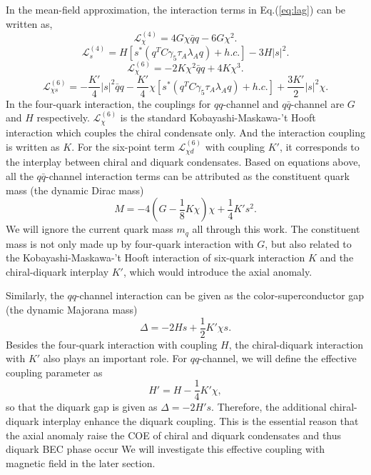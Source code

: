 \documentclass[prd, showpacs,nofootinbib,amsmath,amssymb,12pt]{revtex4}
\begin{document}
In the mean-field approximation, the interaction terms in Eq.(\ref{eq:lag}) can be written as\cite{abuki2010nambu},  
\begin{equation}
\mathcal{L}^{(4)}_{\chi}=4G\chi\bar{q}q-6G\chi^2.
\end{equation}	
\begin{equation}
\mathcal{L}^{(4)}_{s}=H[s^*(q^TC\gamma_5\tau_A\lambda_Aq)+h.c.]-3H|s|^2.
\end{equation}
\begin{equation}
\mathcal{L}^{\left(6\right)}_{\chi}=-2K\chi^2\bar{q}q+4K\chi^3.
\end{equation}
\begin{equation}
\mathcal{L}^{\left(6\right)}_{\chi s}=-\frac{K'}{4}|s|^2\bar{q}q-\frac{K'}{4}\chi[s^*(q^TC\gamma_5\tau_A\lambda_Aq)+h.c.]+\frac{3K'}{2}|s|^2\chi.
\end{equation}
In the four-quark interaction, the couplings for $qq$-channel and $q\bar{q}$-channel are $G$ and $H$ respectively.
$\mathcal{L}^{\left(6\right)}_{\chi}$ is the standard Kobayashi-Maskawa-'t Hooft interaction which couples the chiral condensate only.
And the interaction coupling is written as $K$.
For the six-point term $\mathcal{L}^{\left(6\right)}_{\chi d}$ with coupling $K'$, it corresponds to the interplay between chiral and diquark condensates.
Based on equations above, 
all the $q\bar{q}$-channel interaction terms can be attributed as  the constituent quark mass (the dynamic Dirac mass)
\begin{equation}
M = -4(G-\frac{1}{8}K\chi)\chi + \frac{1}{4}K's^2.
\label{Dmass}
\end{equation}
We will ignore the current quark mass $m_q$ all through this work.
The constituent mass is not only made up by four-quark interaction with $G$,
but also related to the Kobayashi-Maskawa-'t Hooft interaction of six-quark interaction $K$ and the chiral-diquark interplay $K'$, 
which would introduce the axial anomaly.

Similarly, the $qq$-channel  interaction can be given as the color-superconductor gap (the dynamic Majorana mass)
\begin{equation}
\Delta=-2Hs+\frac{1}{2}K'\chi s.
\end{equation}
Besides the four-quark interaction with coupling $H$, the chiral-diquark interaction with $K'$ also plays an important role.
For $qq$-channel, we will define the effective coupling parameter as
\begin{equation}
\label{eq:effectivecoupling}
H'=H - \frac{1}{4}K'\chi,
\end{equation}
so that the diquark gap is given as $\Delta=-2H's$. 
Therefore, the additional chiral-diquark interplay enhance the diquark coupling.
This is the essential reason that the axial anomaly raise the COE of chiral and diquark condensates and thus diquark BEC phase occur
We will investigate this effective coupling with magnetic field in the later section.
\end{document}
